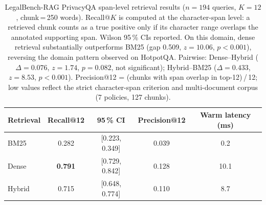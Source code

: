 \begin{table}[ht]
\centering
\small
\caption{LegalBench-RAG PrivacyQA span-level retrieval results ($n=194$ queries,
$K=12$, chunk\,=\,250 words).
Recall@$K$ is computed at the character-span level: a retrieved chunk counts as
a true positive only if its character range overlaps the annotated supporting span.
Wilson 95\,\% CIs reported.
On this domain, dense retrieval substantially outperforms BM25 (gap 0.509,
$z=10.06$, $p<0.001$), reversing the domain pattern observed on HotpotQA.
Pairwise: Dense--Hybrid ($\Delta = 0.076$, $z = 1.74$, $p = 0.082$, not significant);
Hybrid--BM25 ($\Delta = 0.433$, $z = 8.53$, $p < 0.001$).
Precision@12 = (chunks with span overlap in top-12)\,/\,12; low values
reflect the strict character-span criterion and multi-document corpus
(7 policies, 127 chunks).}
\label{tab:legalbenchrag}
\begin{tabular}{lcccc}
\toprule
Retrieval & Recall@12 & 95\,\% CI & Precision@12 & Warm latency (ms) \\
\midrule
BM25 & 0.282 & [0.223, 0.349] & 0.039 & 0.2 \\
Dense & \textbf{0.791} & [0.729, 0.842] & 0.128 & 10.1 \\
Hybrid & 0.715 & [0.648, 0.774] & 0.110 & 8.7 \\
\bottomrule
\end{tabular}
\end{table}
